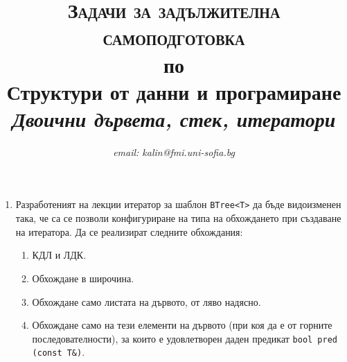 \documentclass[12pt,a4paper]{article}
\author{\textit{email: kalin@fmi.uni-sofia.bg}}
\title{\textsc{Задачи за задължителна самоподготовка} \\
по \\
Структури от данни и програмиране\\
\textit{Двоични дървета, стек, итератори}}
\begin{document}
\maketitle



\begin{enumerate}

	\item Разработеният на лекции итератор за шаблон \texttt{BTree<T>} да бъде видоизменен така, че са се позволи конфигуриране на типа на обхождането при създаване на итератора. Да се реализират следните обхождания:

	\begin{enumerate}
		\item КДЛ и ЛДК.
    \item Обхождане в широчина.
		\item Обхождане само листата на дървото, от ляво надясно.
		\item Обхождане само на тези елементи на дървото (при коя да е от горните последователности), за които е удовлетворен даден предикат \texttt{bool pred (const T\&)}.
  \end{enumerate}


\end{enumerate}
\end{document}

